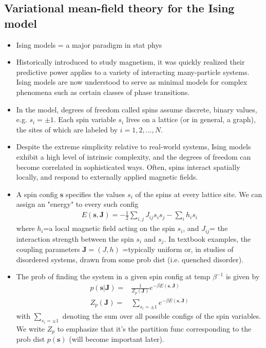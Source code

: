 \documentclass[norsk,a4paper,11pt]{article}
\begin{document}
\subsection{Variational mean-field theory for the Ising model}
\begin{itemize}
	\item Ising models = a major paradigm in stat phys
	\item Historically introduced to study magnetism, it was quickly realized their predictive power applies to a variety of interacting many-particle systems. Ising models are now understood to serve as minimal models for complex phenomena such as certain classes of phase transitions.
	\item In the model, degrees of freedom called spins assume discrete, binary values, e.g. $s_i = \pm 1$. Each spin variable $s_i$ lives on a lattice (or in general, a graph), the sites of which are labeled by $i = 1,2,...,N$.
	\item Despite the extreme simplicity relative to real-world systems, Ising models exhibit a high level of intrinsic complexity, and the degrees of freedom can become correlated in sophisticated ways. Often, spins interact spatially locally, and respond to externally applied magnetic fields.
	\item A spin config $\bm{s}$ specifies the values $s_i$ of the spins at every lattice site. We can assign an "energy" to every such config
	\begin{align}
		E(\bm{s}, \bm{J}) = - \frac{1}{2} \sum_{i,j} J_{ij} s_i s_j - \sum_i h_i s_i
	\end{align}
	where $h_i$=a local magnetic field acting on the spin $s_i$, and $J_{ij}$= the interaction strength between the spin $s_i$ and $s_j$. In textbook examples, the coupling parameters $\bm{J} = (J, h)$ =typically uniform or, in studies of disordered systems, drawn from some prob dist (i.e. quenched disorder).
	\item The prob of finding the system in a given spin config at temp $\beta^{-1}$ is given by 
	\begin{align}
		p(\bm{s}|\bm{J}) =& \frac{1}{Z_p (\bm{J})} e^{-\beta E(\bm{s}, \bm{J})} \\
		Z_p (\bm{J}) =& \sum_{s_i = \pm 1}  e^{-\beta E(\bm{s}, \bm{J})}
	\end{align}
	with $\sum_{s_i = \pm 1} $ denoting the sum over all possible configs of the spin variables. We write $Z_p$ to emphasize that it's the partition func corresponding to the prob dist $p(\bm{s})$ (will become important later).

\end{itemize}
\end{document}
